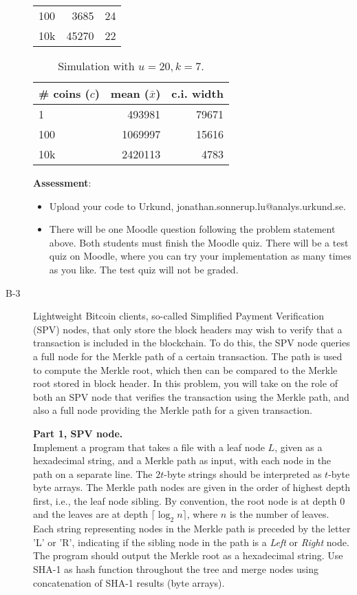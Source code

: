 \documentclass{article}
\begin{document}
\begin{description}
{\begin{table}[h]
\begin{tabular}{lrr}
					100    &       3685 &       24 \\
					
					10k    &      45270 &       22 \\
					\bottomrule
				\end{tabular}
			\end{table}
			
			\begin{table}[h]
				\centering
				\caption{Simulation with $u = 20, k = 7$.}
				\begin{tabular}{lrr}
					\toprule
					\# coins ($c$) & mean ($\bar{x}$) & c.i. width \\
					\midrule
					1      &     493981 &    79671 \\
					100    &    1069997 &    15616 \\
					10k    &    2420113 &     4783 \\
					\bottomrule
				\end{tabular}
			\end{table}
			
			\textbf{Assessment}:
			\begin{itemize}
				\item Upload your code to Urkund, jonathan.sonnerup.lu@analys.urkund.se.
				\item There will be one Moodle question following the problem statement above. Both students must finish the Moodle quiz.	There will be a test quiz on Moodle, where you can try your implementation as many times as you like. The test quiz will not be graded.
			\end{itemize}
		}
		
		\item[B-3] Lightweight Bitcoin clients, so-called Simplified Payment Verification (SPV) nodes, that only store the block headers may wish to verify that a transaction is included in the blockchain. To do this, the SPV node queries a full node for the Merkle path of a certain transaction. The path is used to compute the Merkle root, which then can be compared to the Merkle root stored in block header. In this problem, you will take on the role of both an SPV node that verifies the transaction using the Merkle path, and also a full node providing the Merkle path for a given transaction.
		
		{\bf Part 1, SPV node.}\\ Implement a program that takes a file with a leaf node $L$, given as a hexadecimal string, and a Merkle path as input, with each node in the path on a separate line. The $2t$-byte strings should be interpreted as $t$-byte byte arrays. The Merkle path nodes are given in the order of highest depth first, i.e., the leaf node sibling. By convention, the root node is at depth $0$ and the leaves are at depth $\lceil \log_2 n\rceil$, where $n$ is the number of leaves. Each string representing nodes in the Merkle path is preceded by the letter 'L' or 'R', indicating if the sibling node in the path is a \textit{Left} or \textit{Right} node. The program should output the Merkle root as a hexadecimal string. Use SHA-1 as hash function throughout the tree and merge nodes using concatenation of SHA-1 results (byte arrays).
		

\end{description}
\end{document}
